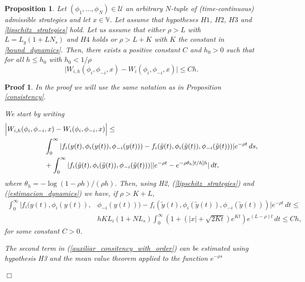 \documentclass[12pt]{article}
\newtheorem{proposition}{Proposition}
\newtheorem{Proof}{Proof}
\newenvironment{proof}{\begin{Proof}\rm}{\hfill $\Box$ \end{Proof}}
\begin{document}
\begin{proposition}\label{consitency_with_order}
Let  $(\phi_1,\dots,\phi_N)\in\mathcal{U}$ an arbitrary $N$-tuple of {(time-continuous)} admissible strategies and let $x\in\mathbb{V}$. Let assume that hypotheses $H1$, $H2$, $H3$ and \eqref{lipschitz_strategies} hold.
Let us assume that either {$\rho> L$} with $L=L_g(1+LN_s)$ and $H4$ holds or {$\rho>L+K$} with $K$ the constant in \eqref{bound_dynamics}.  Then, there exists a
positive constant $C$ and $h_0>0$ such that for all $h\le h_0$ {with $h_0<1/\rho$}
\begin{equation*}
\bigl|W_{i,h}(\phi_i,\phi_{-i},x)-W_i(\phi_i,\phi_{-i},x)\bigr |\le C h.
\end{equation*}
\end{proposition}
\begin{proof}
In the proof we will use the same notation as in Proposition \ref{consistency}.

We start by writing
\begin{align} \label{auxiliar_consitency_with_order}
\Bigl |W_{i,h}({\phi}_i,{\phi}_{-i}&,x)- W_i(\phi_i,\phi_{-i},x)\Bigr |\le\nonumber\\
&\int_0^\infty |f_i(y(t),\phi_i(y(t)),\phi_{-i}(y(t)))-f_i(\tilde{y}(t),{\phi}_i(\tilde{y}(t)),\phi_{-i}(\tilde{y}(t)))|e^{-\rho t}\, ds,\nonumber\\
&+\int_0^\infty|f_i(\tilde{y}(t),{\phi}_i(\tilde{y}(t)),\phi_{-i}(\tilde{y}(t)))||e^{-\rho t}-e^{- \rho\theta_h[t/h]h}|\, dt,
\end{align}
where $\theta_h=-\log(1-\rho h)/(\rho h)$.
Then, using  H2, (\ref{lipschitz_strategies}) and (\ref{estimacion_dynamics}) we have, if {$\rho>K+ L$},
\begin{equation*}
\begin{split}
\int_0^\infty |f_i(y(t),\phi_i(y(t)),&\phi_{-i}(y(t)))-f_i(\tilde{y}(t),{\phi}_i(\tilde{y}(t)),\phi_{-i}(\tilde{y}(t)))|e^{-\rho t}\, dt\le \\
&hKL_i(1+NL_s)\int_0^\infty\left(1+(|x|+\sqrt{2Kt})e^{Kt}\right)e^{(L-\rho)t} \, dt \le C h,
\end{split}
\end{equation*}
for some constant $C>0$.

The second term in (\ref{auxiliar_consitency_with_order}) can be estimated using hypothesis H3 and the mean
 value theorem {applied to the function $e^{-\rho s}$}


\end{proof}
\end{document}

